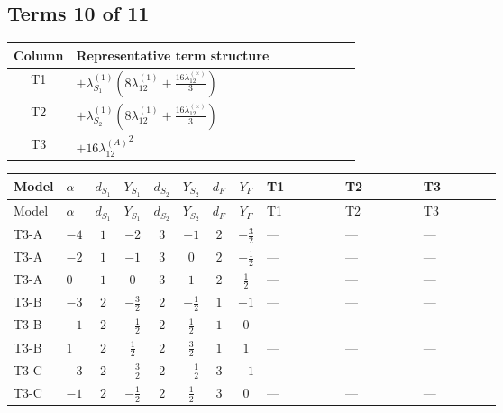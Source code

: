 \documentclass[8pt]{article}
\begin{document}
\begin{landscape}
\subsection*{Terms 10 of 11}
\begin{center}
\begin{tabular}{@{}c >{\raggedright\arraybackslash}p{0.82\linewidth}@{}}
\toprule
Column & Representative term structure \\
\midrule
T1 & \(\displaystyle +{\lambda_{S_1}^{(1)}} \left(8 {\lambda_{12}^{(1)}}+\frac{16 {\lambda_{12}^{(\times)}}}{3}\right)\) \\
\midrule
T2 & \(\displaystyle +{\lambda_{S_2}^{(1)}} \left(8 {\lambda_{12}^{(1)}}+\frac{16 {\lambda_{12}^{(\times)}}}{3}\right)\) \\
\midrule
T3 & \(\displaystyle +16 {\lambda_{12}^{(A)}}^2\) \\
\midrule
\bottomrule
\end{tabular}
\end{center}
\smallskip
\tiny
\begin{longtable}{@{}llcccccc >{\raggedright\arraybackslash}p{0.21\linewidth} >{\raggedright\arraybackslash}p{0.21\linewidth} >{\raggedright\arraybackslash}p{0.21\linewidth}@{}}
\toprule
Model & $\alpha$ & $d_{S_1}$ & $Y_{S_1}$ & $d_{S_2}$ & $Y_{S_2}$ & $d_F$ & $Y_F$ & T1 & T2 & T3 \\
\midrule
\endfirsthead
\toprule
Model & $\alpha$ & $d_{S_1}$ & $Y_{S_1}$ & $d_{S_2}$ & $Y_{S_2}$ & $d_F$ & $Y_F$ & T1 & T2 & T3 \\
\midrule
\endhead
T3-A & $-4$ & $1$ & $-2$ & $3$ & $-1$ & $2$ & $-\frac{3}{2}$ & --- & --- & --- \\
\midrule
T3-A & $-2$ & $1$ & $-1$ & $3$ & $0$ & $2$ & $-\frac{1}{2}$ & --- & --- & --- \\
\midrule
T3-A & $0$ & $1$ & $0$ & $3$ & $1$ & $2$ & $\frac{1}{2}$ & --- & --- & --- \\
\midrule
T3-B & $-3$ & $2$ & $-\frac{3}{2}$ & $2$ & $-\frac{1}{2}$ & $1$ & $-1$ & --- & --- & --- \\
\midrule
T3-B & $-1$ & $2$ & $-\frac{1}{2}$ & $2$ & $\frac{1}{2}$ & $1$ & $0$ & --- & --- & --- \\
\midrule
T3-B & $1$ & $2$ & $\frac{1}{2}$ & $2$ & $\frac{3}{2}$ & $1$ & $1$ & --- & --- & --- \\
\midrule
T3-C & $-3$ & $2$ & $-\frac{3}{2}$ & $2$ & $-\frac{1}{2}$ & $3$ & $-1$ & --- & --- & --- \\
\midrule
T3-C & $-1$ & $2$ & $-\frac{1}{2}$ & $2$ & $\frac{1}{2}$ & $3$ & $0$ & --- & --- & --- \\

\end{longtable}
\end{landscape}
\end{document}
